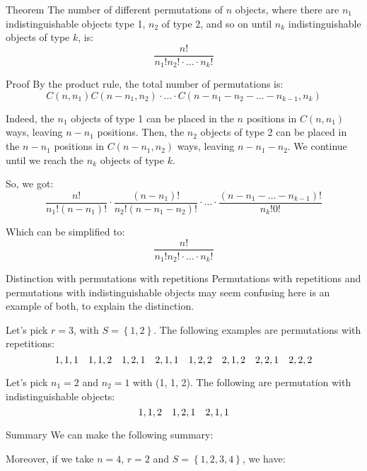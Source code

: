 \documentclass[a4paper]{article}
\begin{document}
\begin{parag}{Theorem}
    The number of different permutations of $n$ objects, where there are $n_1$ indistinguishable objects type 1, $n_2$ of type 2, and so on until $n_k$ indistinguishable objects of type $k$, is: 
    \[\frac{n!}{n_1! n_2! \cdot \ldots \cdot n_k!}\]
    
    \begin{subparag}{Proof}
        By the product rule, the total number of permutations is:
        \[C\left(n, n_1\right)C\left(n - n_1, n_2\right)\cdot\ldots\cdot C\left(n - n_1 - n_2 - \ldots - n_{k-1}, n_k\right)\]

        Indeed, the $n_1$ objects of type 1 can be placed in the $n$ positions in $C\left(n, n_1\right)$ ways, leaving $n - n_1$ positions. Then, the $n_2$ objects of type 2 can be placed in the $n - n_1$ positions in $C\left(n - n_1, n_2\right)$ ways, leaving $n - n_1 - n_2$. We continue until we reach the $n_k$ objects of type $k$. 

        So, we got:
        \[\frac{n!}{n_1!\left(n - n_1\right)!} \cdot \frac{\left(n - n_1\right)!}{n_2!\left(n - n_1 - n_2\right)!} \cdot \ldots \cdot \frac{\left(n - n_1 - \ldots - n_{k-1}\right)!}{n_k! 0!}\]

        Which can be simplified to: 
        \[\frac{n!}{n_1!n_2!\cdot\ldots\cdot n_k!}\]
            
    \end{subparag}

    \begin{subparag}{Distinction with permutations with repetitions}
        Permutations with repetitions and permutations with indistinguishable objects may seem confusing here is an example of both, to explain the distinction.

        Let's pick $r = 3$, with $S = \left\{1, 2\right\}$. The following examples are permutations with repetitions: 
        \[1,1,1 \quad 1,1,2 \quad 1,2,1 \quad 2,1,1 \quad 1, 2, 2 \quad 2, 1, 2 \quad 2, 2, 1 \quad 2, 2, 2\]
        
        Let's pick $n_1 = 2$ and $n_2 = 1$ with (1, 1, 2). The following are permutation with indistinguishable objects:
        \[1, 1, 2 \quad 1, 2, 1 \quad 2, 1, 1\]
    \end{subparag}
\end{parag}

\begin{parag}{Summary}
    We can make the following summary:
    
    Moreover, if we take $n = 4$, $r = 2$ and $S = \left\{1, 2, 3, 4\right\}$, we have:
\end{parag}
\end{document}
